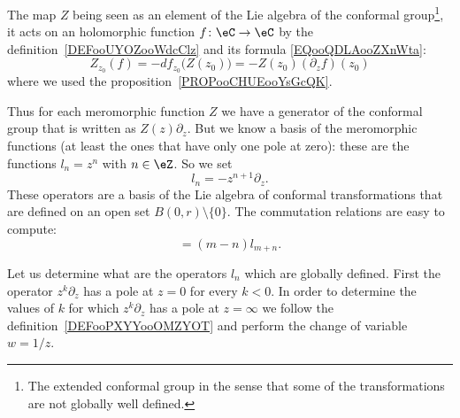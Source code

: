 \begin{normaltext}  \label{NORMooHDLPooQBfEif}
    The map \( Z\) being seen as an element of the Lie algebra of the conformal group\footnote{The extended conformal group in the sense that some of the transformations are not globally well defined.}, it acts on an holomorphic function \( f\colon \eC\to \eC \) by the definition~\ref{DEFooUYOZooWdcClz} and its formula \eqref{EQooQDLAooZXnWta}:
    \begin{equation}
        Z_{z_0}(f)=-df_{z_0}\big( Z(z_0) \big)=-Z(z_0)(\partial_zf)(z_0)
    \end{equation}
    where we used the proposition~\ref{PROPooCHUEooYsGcQK}.
\end{normaltext}

Thus for each meromorphic function \( Z\) we have a generator of the conformal group that is written as \( Z(z)\partial_z\). But we know a basis of the meromorphic functions (at least the ones that have only one pole at zero): these are the functions \( l_n=z^n \) with \( n\in \eZ\). So we set
\begin{equation}
    l_n=-z^{n+1}\partial_z.
\end{equation}
These operators are a basis of the Lie algebra of conformal transformations that are defined on an open set \( B(0,r)\setminus \{ 0 \}\). The commutation relations are easy to compute:
\begin{equation}
    [l_m,l_n]=(m-n)l_{m+n}.
\end{equation}

Let us determine what are the operators \( l_n\) which are globally defined\cite{ooPEEYooCndpvc}. First the operator \( z^k\partial_z\) has a pole at \( z=0\) for every \( k<0\). In order to determine the values of \( k\) for which \( z^k\partial_z\) has a pole at \( z=\infty\) we follow the definition~\ref{DEFooPXYYooOMZYOT} and perform the change of variable \(w=1/z\).

